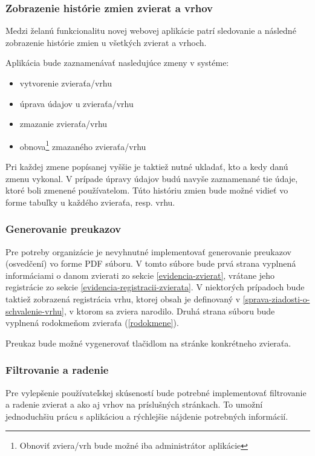 \subsubsection{Zobrazenie histórie zmien zvierat a vrhov}
Medzi želanú funkcionalitu novej webovej aplikácie patrí sledovanie a následné zobrazenie histórie zmien u všetkých zvierat a vrhoch.

Aplikácia bude zaznamenávať nasledujúce zmeny v systéme:
\begin{itemize}
	\item vytvorenie zvieraťa/vrhu
	\item úprava údajov u zvieraťa/vrhu
	\item zmazanie zvieraťa/vrhu
	\item obnova\footnote{Obnoviť zviera/vrh bude možné iba administrátor aplikácie} zmazaného zvieraťa/vrhu
\end{itemize}

Pri každej zmene popísanej vyššie je taktiež nutné ukladať, kto a kedy danú zmenu vykonal. V prípade úpravy údajov budú navyše zaznamenané tie údaje, ktoré boli zmenené používatelom. Túto históriu zmien bude možné vidieť vo forme tabuľky u každého zvieraťa, resp. vrhu.


\subsubsection{Generovanie preukazov}\label{generovanie-preukazov}
Pre potreby organizácie je nevyhnutné implementovať generovanie preukazov (osvedčení) vo forme PDF súboru. V tomto súbore bude prvá strana vyplnená informáciami o danom zvierati zo sekcie \ref{evidencia-zvierat}, vrátane jeho registrácie zo sekcie \ref{evidencia-registracii-zvierata}. V niektorých prípadoch bude taktiež zobrazená registrácia vrhu, ktorej obsah je definovaný v \ref{sprava-ziadosti-o-schvalenie-vrhu}, v ktorom sa zviera narodilo. Druhá strana súboru bude vyplnená rodokmeňom zvieraťa (\ref{rodokmene}).

Preukaz bude možné vygenerovať tlačidlom na stránke konkrétneho zvieraťa.

\subsubsection{Filtrovanie a radenie}
Pre vylepšenie používateľskej skúseností bude potrebné implementovať filtrovanie a radenie zvierat a ako aj vrhov na príslušných stránkach. To umožní jednoduchšiu prácu s aplikáciou a rýchlejšie nájdenie potrebných informácií.

